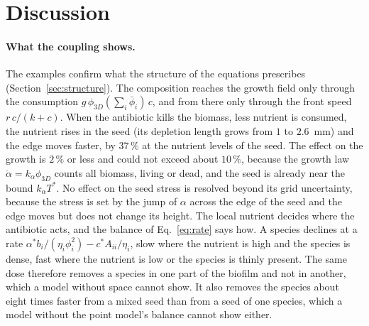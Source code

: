 \documentclass[11pt,a4paper]{article}
\newcommand{\phiD}{\phi_{3D}}
\newcommand{\lv}{\textstyle\sum_i\bar\phi_i}
\begin{document}
\section{Discussion}
\label{sec:discussion}

\paragraph{What the coupling shows.} The examples confirm what the structure of the equations prescribes (Section~\ref{sec:structure}). The composition reaches the growth field only through the consumption $g\,\phiD(\lv)\,c$, and from there only through the front speed $r\,c/(k+c)$. When the antibiotic kills the biomass, less nutrient is consumed, the nutrient rises in the seed (its depletion length grows from $1$ to $2.6$~mm) and the edge moves faster, by $37\,\%$ at the nutrient levels of the seed. The effect on the growth is $2\,\%$ or less and could not exceed about $10\,\%$, because the growth law $\dot\alpha=k_\alpha\phiD$ counts all biomass, living or dead, and the seed is already near the bound $k_\alpha T^*$. No effect on the seed stress is resolved beyond its grid uncertainty, because the stress is set by the jump of $\alpha$ across the edge of the seed and the edge moves but does not change its height. The local nutrient decides where the antibiotic acts, and the balance of Eq.~\eqref{eq:rate} says how. A species declines at a rate $\alpha^*b_i/(\eta_i\phi_i^2)-c^*A_{ii}/\eta_i$, slow where the nutrient is high and the species is dense, fast where the nutrient is low or the species is thinly present. The same dose therefore removes a species in one part of the biofilm and not in another, which a model without space cannot show. It also removes the species about eight times faster from a mixed seed than from a seed of one species, which a model without the point model's balance cannot show either.
\end{document}
